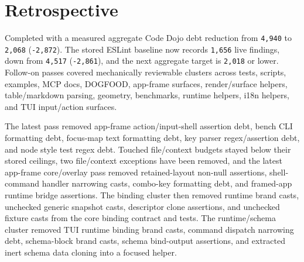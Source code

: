 \section{Retrospective}\label{record-217-retrospective}

Completed with a measured aggregate Code Dojo debt reduction from \texttt{4\allowbreak{},\allowbreak{}9\allowbreak{}4\allowbreak{}0} to \texttt{2\allowbreak{},\allowbreak{}0\allowbreak{}6\allowbreak{}8} (\texttt{-\allowbreak{}2\allowbreak{},\allowbreak{}8\allowbreak{}7\allowbreak{}2}). The stored ESLint baseline now records \texttt{1\allowbreak{},\allowbreak{}6\allowbreak{}5\allowbreak{}6} live findings, down from \texttt{4\allowbreak{},\allowbreak{}5\allowbreak{}1\allowbreak{}7} (\texttt{-\allowbreak{}2\allowbreak{},\allowbreak{}8\allowbreak{}6\allowbreak{}1}), and the next aggregate target is \texttt{2\allowbreak{},\allowbreak{}0\allowbreak{}1\allowbreak{}8} or lower. Follow-on passes covered mechanically reviewable clusters across tests, scripts, examples, MCP docs, DOGFOOD, app-frame surfaces, render/surface helpers, table/markdown parsing, geometry, benchmarks, runtime helpers, i18n helpers, and TUI input/action surfaces.

The latest pass removed app-frame action/input-shell assertion debt, bench CLI formatting debt, focus-map text formatting debt, key parser regex/assertion debt, and node style test regex debt. Touched file/context budgets stayed below their stored ceilings, two file/context exceptions have been removed, and the latest app-frame core/overlay pass removed retained-layout non-null assertions, shell-command handler narrowing casts, combo-key formatting debt, and framed-app runtime bridge assertions. The binding cluster then removed runtime brand casts, unchecked generic snapshot casts, descriptor clone assertions, and unchecked fixture casts from the core binding contract and tests. The runtime/schema cluster removed TUI runtime binding brand casts, command dispatch narrowing debt, schema-block brand casts, schema bind-output assertions, and extracted inert schema data cloning into a focused helper.

